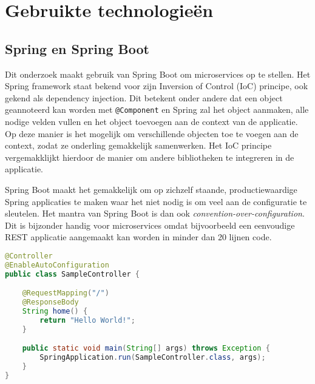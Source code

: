 
\chapter{Gebruikte technologieën}
\label{ch:technologie}



\section{Spring en Spring Boot}
\label{sec:spring-boot}

Dit onderzoek maakt gebruik van Spring Boot om microservices op te stellen. Het Spring framework staat bekend voor zijn Inversion of Control (IoC) principe, ook gekend als dependency injection. Dit betekent onder andere dat een object geannoteerd kan worden met \texttt{@Component} en Spring zal het object aanmaken, alle nodige velden vullen en het object toevoegen aan de context van de applicatie. Op deze manier is het mogelijk om verschillende objecten toe te voegen aan de context, zodat ze onderling gemakkelijk samenwerken. Het IoC principe vergemakklijkt hierdoor de manier om andere bibliotheken te integreren in de applicatie.

Spring Boot maakt het gemakkelijk om op zichzelf staande, productiewaardige Spring applicaties te maken waar het niet nodig is om veel aan de configuratie te sleutelen. Het mantra van Spring Boot is dan ook \textit{convention-over-configuration}. Dit is bijzonder handig voor microservices omdat bijvoorbeeld een eenvoudige REST applicatie aangemaakt kan worden in minder dan 20 lijnen code.

\begin{lstlisting}[language=Java, basicstyle=\ttfamily\small, caption=eenvoudige Spring Boot REST app]
@Controller
@EnableAutoConfiguration
public class SampleController {

    @RequestMapping("/")
    @ResponseBody
    String home() {
        return "Hello World!";
    }

    public static void main(String[] args) throws Exception {
        SpringApplication.run(SampleController.class, args);
    }
}
\end{lstlisting}


